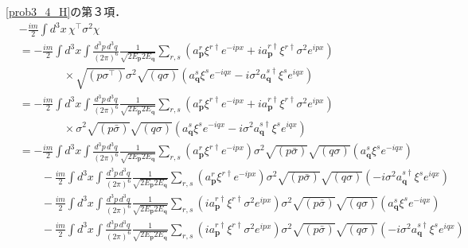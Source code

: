 \eqref{prob3_4_H}の第３項．
\begin{align*}
  & - \frac{im}{2}\int d^3x \, \chi^\top \sigma^2 \chi \\
  & = - \frac{im}{2}\int d^3x \int \frac{d^3p\,d^3q}{(2\pi)^6} \frac{1}{\sqrt{2E_{\boldsymbol{p}}2E_{\boldsymbol{q}}}}
  \sum_{r, s} \left( a_{\boldsymbol{p}}^{r} \xi^{r\dagger} e^{-ipx} + i a_{\boldsymbol{p}}^{r\dagger} \xi^{r\dagger} \sigma^2 e^{ipx} \right) \\
  & \qquad \qquad \times \sqrt{(p\sigma^\top)} \sigma^2 \sqrt{(q \sigma)} \left( a_{\boldsymbol{q}}^s \xi^s e^{-iqx} - i \sigma^2 a_{\boldsymbol{q}}^{s\dagger} \xi^s e^{iqx} \right) \\
  & = - \frac{im}{2}\int d^3x \int \frac{d^3p\,d^3q}{(2\pi)^6} \frac{1}{\sqrt{2E_{\boldsymbol{p}}2E_{\boldsymbol{q}}}}
  \sum_{r, s} \left( a_{\boldsymbol{p}}^{r} \xi^{r\dagger} e^{-ipx} + i a_{\boldsymbol{p}}^{r\dagger} \xi^{r\dagger} \sigma^2 e^{ipx} \right) \\
  & \qquad \qquad \times \sigma^2 \sqrt{(p\bar\sigma)} \sqrt{(q \sigma)} \left( a_{\boldsymbol{q}}^s \xi^s e^{-iqx} - i \sigma^2 a_{\boldsymbol{q}}^{s\dagger} \xi^s e^{iqx} \right) \\
  & = - \frac{im}{2}\int d^3x \int \frac{d^3p\,d^3q}{(2\pi)^6} \frac{1}{\sqrt{2E_{\boldsymbol{p}}2E_{\boldsymbol{q}}}}
  \sum_{r, s} \left( a_{\boldsymbol{p}}^{r} \xi^{r\dagger} e^{-ipx} \right) \sigma^2 \sqrt{(p\bar\sigma)} \sqrt{(q \sigma)} \left( a_{\boldsymbol{q}}^s \xi^s e^{-iqx}\right) \\
  & \qquad - \frac{im}{2}\int d^3x \int \frac{d^3p\,d^3q}{(2\pi)^6} \frac{1}{\sqrt{2E_{\boldsymbol{p}}2E_{\boldsymbol{q}}}}
  \sum_{r, s} \left( a_{\boldsymbol{p}}^{r} \xi^{r\dagger} e^{-ipx} \right) \sigma^2 \sqrt{(p\bar\sigma)} \sqrt{(q \sigma)} \left( - i \sigma^2 a_{\boldsymbol{q}}^{s\dagger} \xi^s e^{iqx} \right) \\
  & \qquad - \frac{im}{2}\int d^3x \int \frac{d^3p\,d^3q}{(2\pi)^6} \frac{1}{\sqrt{2E_{\boldsymbol{p}}2E_{\boldsymbol{q}}}}
  \sum_{r, s} \left( i a_{\boldsymbol{p}}^{r\dagger} \xi^{r\dagger} \sigma^2 e^{ipx} \right) \sigma^2 \sqrt{(p\bar\sigma)} \sqrt{(q \sigma)} \left( a_{\boldsymbol{q}}^s \xi^s e^{-iqx} \right) \\
  & \qquad - \frac{im}{2}\int d^3x \int \frac{d^3p\,d^3q}{(2\pi)^6} \frac{1}{\sqrt{2E_{\boldsymbol{p}}2E_{\boldsymbol{q}}}}
  \sum_{r, s} \left( i a_{\boldsymbol{p}}^{r\dagger} \xi^{r\dagger} \sigma^2 e^{ipx} \right) \sigma^2 \sqrt{(p\bar\sigma)} \sqrt{(q \sigma)} \left( - i \sigma^2 a_{\boldsymbol{q}}^{s\dagger} \xi^s e^{iqx} \right) \\

\end{align*}
